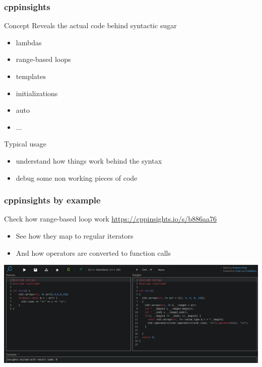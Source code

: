 \begin{frame}
  \frametitle{cppinsights}
  \begin{block}{Concept}
    Reveals the actual code behind \cpp syntactic sugar
    \begin{itemize}
    \item lambdas
    \item range-based loops
    \item templates
    \item initializations
    \item auto
    \item ...
    \end{itemize}
  \end{block}
  \begin{exampleblock}{Typical usage}
    \begin{itemize}
    \item understand how things work behind the \cpp syntax
    \item debug some non working pieces of code
    \end{itemize}
  \end{exampleblock}
\end{frame}

\begin{frame}
  \frametitle{cppinsights by example}
  \begin{block}{Check how range-based loop work}
    \url{https://cppinsights.io/s/b886aa76}
    \begin{itemize}
    \item See how they map to regular iterators
    \item And how operators are converted to function calls
    \end{itemize}
  \end{block}
  \includegraphics[width=\textwidth]{tools/cppinsights.png}
\end{frame}
